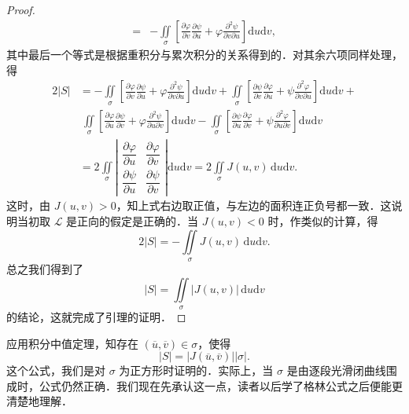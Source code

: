 \begin{proof}
\[\begin{aligned}
=&-\iint\limits_{\sigma}\left[\frac{\partial\varphi}{\partial v}\frac{\partial\psi}{\partial u}+\varphi\frac{\partial^{2}\psi}{\partial v\partial u}\right]\mathrm{d}u\mathrm{d}v,
\end{aligned}
\]
其中最后一个等式是根据重积分与累次积分的关系得到的．对其余六项同样处理，得
\[
\begin{aligned}
2\left|S\right|&=-\iint\limits_{\sigma}\left[\frac{\partial\varphi}{\partial v}\frac{\partial\psi}{\partial u}+\varphi\frac{\partial^{2}\psi}{\partial v\partial u}\right]\mathrm{d}u\mathrm{d}v+\iint\limits_{\sigma}\left[\frac{\partial\psi}{\partial v}\frac{\partial\varphi}{\partial u}+\psi\frac{\partial^{2}\varphi}{\partial v\partial u}\right]\mathrm{d}u\mathrm{d}v+\\
&\ \iint\limits_{\sigma}\left[\frac{\partial\varphi}{\partial u}\frac{\partial\psi}{\partial v}+\varphi\frac{\partial^{2}\psi}{\partial u\partial v}\right]\mathrm{d}u\mathrm{d}v-\iint\limits_{\sigma}\left[\frac{\partial\psi}{\partial u}\frac{\partial\varphi}{\partial v}+\psi\frac{\partial^{2}\varphi}{\partial u\partial v}\right]\mathrm{d}u\mathrm{d}v\\
&=2\iint\limits_{\sigma}\left|\begin{matrix}\dfrac{\partial\varphi}{\partial u}&\dfrac{\partial\varphi}{\partial v}\\[6pt]
\dfrac{\partial\psi}{\partial u}&\dfrac{\partial\psi}{\partial v}\end{matrix}\right|\mathrm{d}u\mathrm{d}v=2\iint\limits_{\sigma}J(u,v)\,\mathrm{d}u\mathrm{d}v.
\end{aligned}
\]
这时，由 $J(u,v)>0$，知上式右边取正值，与左边的面积连正负号都一致．这说明当初取 $\mathcal{L}$ 是正向的假定是正确的．当 $J(u,v)<0$ 时，作类似的计算，得
\[
2\left|S\right|=-\iint\limits_{\sigma}J(u,v)\,\mathrm{d}u\mathrm{d}v.
\]
总之我们得到了
\[
\left|S\right|=\iint\limits_{\sigma}\left|J(u,v)\right|\,\mathrm{d}u\mathrm{d}v
\]
的结论，这就完成了引理的证明．
\end{proof}

应用积分中值定理，知存在 $(\overline{u},\overline{v})\in\sigma$，使得
\begin{equation}\label{eq:20-3-4}
\left|S\right|=\left|J(\overline{u},\overline{v})\right|\left|\sigma\right|.
\tag{4}
\end{equation}
这个公式，我们是对 $\sigma$ 为正方形时证明的．实际上，当 $\sigma$ 是由逐段光滑闭曲线围成时，公式仍然正确．我们现在先承认这一点，读者以后学了格林公式之后便能更清楚地理解．

